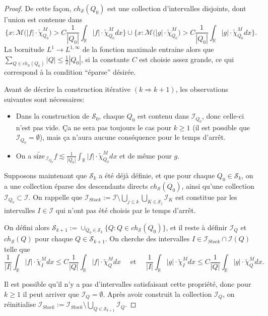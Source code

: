 \documentclass[11pt]{amsart}
\newcommand{\sssize}{\widetilde{\text{size}\,}}
\newcommand{\rr}{\mathbb}
\newcommand{\ii}{\mathscr}
\newcommand{\ic}{\mathcal}
\newcommand{\ci}{\tilde{\chi}}
\newcommand{\ds}{\displaystyle}
\begin{document}
\begin{proof}
De cette fa\c{c}on, $ch_{\ic S}(Q_0)$ est une collection d'intervalles disjoints, dont l'union est contenue dans
\[
\big\lbrace x: \ic M \big( |f| \cdot \ci_{Q_0}^M \big) > C \frac{1}{|Q_0|}\int_{\rr R} |f| \cdot \ci_{Q_0}^M dx   \big\rbrace \cup \big\lbrace x: \ic M \big( |g| \cdot \ci_{Q_0}^M \big)> C \frac{1}{|Q_0|}\int_{\rr R} |g| \cdot \ci_{Q_0}^M dx    \big\rbrace.
\]
La bornitude $L^1 \to L^{1, \infty}$ de la fonction maximale entraine alors que $\ds \sum_{Q \in ch_{\ic S}(Q_0)}|Q| \leq \frac{1}{2}|Q_0|$, si la constante $C$ est choisie assez grande,  ce qui correspond \`a la condition ``\'eparse'' d\'esir\'ee. 

Avant de d\'ecrire la construction it\'erative  $(k \Rightarrow k+1)$, les observations suivantes sont n\'ecessaires:
\begin{itemize}
\item[(a)] Dans la construction de $\ic S_0$, chaque $Q_0$ est contenu dans $\ii I_{Q_0}$, donc celle-ci n'est pas vide. \c{C}a ne sera pas toujours le cas pour $k \geq 1$ (il est possible que $\ii I_{Q_0} =\emptyset$), mais \c{c}a n'aura aucune cons\'equence pour le temps d'arr\^et.
\item[(b)] On a $\sssize_{\ii I_{Q_0}} f \lesssim \frac{1}{|Q_0|} \int_{\rr R} |f| \cdot \ci_{Q_0}^M dx$ et de m\^eme pour $g$.
\end{itemize}

Supposons maintenant que $\ic S_k$ a \'et\'e d\'ejà d\'efinie, et que pour chaque $Q_0 \in \ic S_k$, on a une collection \'eparse des descendants directs $ch_{\ic S}(Q_0)$, ainsi qu'une collection $\ii I_{Q_0} \subset \ii I$. On rappelle que $\ds \ii I_{Stock}:=\ii I \setminus \bigcup_{j \leq k} \bigcup_{K \in \ic S_j} \ii I_K$ est constitue par les intervalles $I \in \ii I$ qui n'ont pas \'et\'e choisis par le temps d'arr\^et. 

On d\'efini alors $\ic S_{k+1}:= \cup_{Q_0 \in \ic S_k} \lbrace Q: Q \in ch_{\ic S}(Q_0) \rbrace$, et il reste \`a d\'efinir $\ii I_Q$ et $ch_{\ic S}(Q)$ pour chaque $Q \in \ic S_{k+1}$.
On cherche des intervalles $I \in \ii I_{Stock} \cap \ii I(Q)$ telle que 
\begin{equation}
\label{eq:condition-k}
\frac{1}{|I|} \int_{\rr R} |f| \cdot \ci_I^M dx \leq C \frac{1}{|Q|} \int_{\rr R} |f| \cdot \ci_{Q}^M dx \quad   \text{    et     } \quad \frac{1}{|I|} \int_{\rr R} |g| \cdot \ci_I^M dx \leq C \frac{1}{|Q|} \int_{\rr R} |g| \cdot \ci_{Q}^M dx.
\end{equation}

Il est possible qu'il n'y a pas d'intervalles satisfaisant cette propri\'et\'e, donc pour $k \geq 1$ il peut arriver que $\ii I_Q =\emptyset$. Apr\`es avoir construit la collection $\ii I_Q$, on r\'einitialise $\ds\ii I_{Stock}:=\ii I_{Stock} \setminus \bigcup_{Q \in \ic S_{k+1}} \ii I_Q$.


\end{proof}
\end{document}
